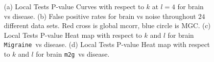 \documentclass[11pt]{article}
\providecommand{\sct}[1]{{\sc \texttt{#1}}}
\newcommand{\Migraine}{\sct{Migraine}}
\newcommand{\mtg}{\sct{m2g}}
\begin{document}
\begin{figure}[htbp]
\centering
{}
\hfil
\centering
{}
\hfil
\centering
{}
\hfil
\centering
{}
\caption{
(a) Local Tests P-value Curves with respect to $k$ at $l=4$ for brain vs disease. 
(b) False positive rates for brain vs noise throughout $24$ different data sets. Red cross is global mcorr, blue circle is MGC.
(c) Local Tests P-value Heat map with respect to $k$ and $l$ for brain \Migraine~vs disease. 
(d) Local Tests P-value Heat map with respect to $k$ and $l$ for brain \mtg~vs disease. }
\label{figReal}
\end{figure}
\end{document}
